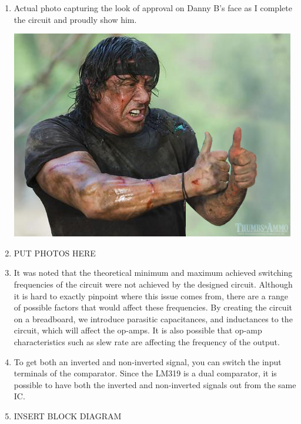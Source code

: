 \documentclass[a4paper,11pt]{article}
\begin{document}
\begin{preview}
\begin{enumerate}
    \item 
    Actual photo capturing the look of approval on Danny B's face as I complete the circuit and proudly show him.
    \begin{center}
        \includegraphics[width = \textwidth]{Danny_B.jpg}
    \end{center}
    \vspace{20pt}

    \item PUT PHOTOS HERE \\
    
    
    \item It was noted that the theoretical minimum and maximum achieved switching frequencies of the circuit were not achieved by the designed circuit. Although it is hard to exactly pinpoint where this issue comes from, there are a range of possible factors that would affect these frequencies. By creating the circuit on a breadboard, we introduce parasitic capacitances, and inductances to the circuit, which will affect the op-amps. It is also possible that op-amp characteristics such as slew rate are affecting the frequency of the output. \\
    
    
    \item To get both an inverted and non-inverted signal, you can switch the input terminals of the comparator. Since the LM319 is a dual comparator, it is possible to have both the inverted and non-inverted signals out from the same IC. \\
    

    \item INSERT BLOCK DIAGRAM



\end{enumerate}
\end{preview}
\end{document}
